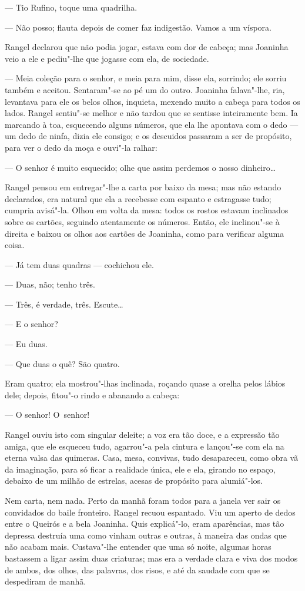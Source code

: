 \begin{linenumbers}
--- Tio Rufino, toque uma quadrilha.

--- Não posso; flauta depois de comer faz indigestão. Vamos a um víspora.

Rangel declarou que não podia jogar, estava com dor de cabeça; mas
Joaninha veio a ele e pediu"-lhe que jogasse com ela, de sociedade.

--- Meia coleção para o senhor, e meia para mim, disse ela, sorrindo; ele
sorriu também e aceitou. Sentaram"-se ao pé um do outro. Joaninha
falava"-lhe, ria, levantava para ele os belos olhos, inquieta, mexendo
muito a cabeça para todos os lados. Rangel sentiu"-se melhor e não tardou
que se sentisse inteiramente bem. Ia marcando à toa, esquecendo alguns
números, que ela lhe apontava com o dedo --- um dedo de ninfa, dizia ele
consigo; e os descuidos passaram a ser de propósito, para ver o dedo da
moça e ouvi"-la ralhar:

--- O senhor é muito esquecido; olhe que assim perdemos o nosso
dinheiro\ldots{}

Rangel pensou em entregar"-lhe a carta por baixo da mesa; mas não estando
declarados, era natural que ela a recebesse com espanto e estragasse
tudo; cumpria avisá"-la. Olhou em volta da mesa: todos os rostos estavam
inclinados sobre os cartões, seguindo atentamente os números. Então, ele
inclinou"-se à direita e baixou os olhos aos cartões de Joaninha, como
para verificar alguma coisa.

--- Já tem duas quadras --- cochichou ele.

--- Duas, não; tenho três.

--- Três, é verdade, três. Escute\ldots{}

--- E o senhor?

--- Eu duas.

--- Que duas o quê? São quatro.

Eram quatro; ela mostrou"-lhas inclinada, roçando quase a orelha pelos
lábios dele; depois, fitou"-o rindo e abanando a cabeça:

--- O senhor! O~senhor!

Rangel ouviu isto com singular deleite; a voz era tão doce, e a
expressão tão amiga, que ele esqueceu tudo, agarrou"-a pela cintura e
lançou"-se com ela na eterna valsa das quimeras. Casa, mesa, convivas,
tudo desapareceu, como obra vã da imaginação, para só ficar a realidade
única, ele e ela, girando no espaço, debaixo de um milhão de estrelas,
acesas de propósito para alumiá"-los.

Nem carta, nem nada. Perto da manhã foram todos para a janela ver sair
os convidados do baile fronteiro. Rangel recuou espantado. Viu um aperto
de dedos entre o Queirós e a bela Joaninha. Quis explicá"-lo, eram
aparências, mas tão depressa destruía uma como vinham outras e outras, à
maneira das ondas que não acabam mais. Custava"-lhe entender que uma só
noite, algumas horas bastassem a ligar assim duas criaturas; mas era a
verdade clara e viva dos modos de ambos, dos olhos, das palavras, dos
risos, e até da saudade com que se despediram de manhã.


\end{linenumbers}
